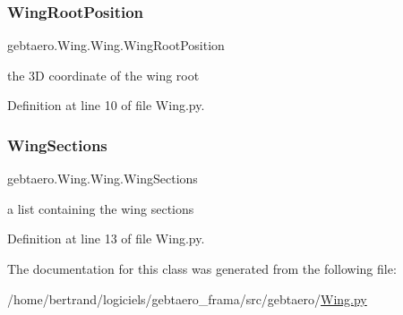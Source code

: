 \subsubsection{\texorpdfstring{Wing\+Root\+Position}{WingRootPosition}}
{\footnotesize\ttfamily gebtaero.\+Wing.\+Wing.\+Wing\+Root\+Position}



the 3D coordinate of the wing root 



Definition at line 10 of file Wing.\+py.

\mbox{\label{classgebtaero_1_1_wing_1_1_wing_a87db863f3c208b18c8e7594d75598a1d}} 
\subsubsection{\texorpdfstring{Wing\+Sections}{WingSections}}
{\footnotesize\ttfamily gebtaero.\+Wing.\+Wing.\+Wing\+Sections}



a list containing the wing sections 



Definition at line 13 of file Wing.\+py.



The documentation for this class was generated from the following file\+:\begin{DoxyCompactItemize}
\item 
/home/bertrand/logiciels/gebtaero\+\_\+frama/src/gebtaero/\hyperlink{_wing_8py}{Wing.\+py}\end{DoxyCompactItemize}
